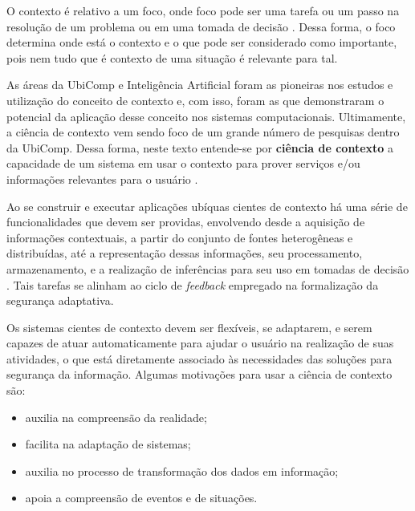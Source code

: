\documentclass[tid,table]{texufpel} %
\begin{document}
O contexto é relativo a um foco, onde foco pode ser uma tarefa ou um passo na resolução de um problema ou em uma tomada de decisão \cite{brezillon05}. Dessa forma, o foco determina onde está o contexto e o que pode ser considerado como importante, pois nem tudo que é contexto de uma situação é relevante para tal. 
 
As áreas da UbiComp e Inteligência Artificial foram as pioneiras nos estudos e utilização do conceito de contexto e, com isso, foram as que demonstraram o potencial da aplicação desse conceito nos sistemas computacionais. Ultimamente, a ciência de contexto vem sendo foco de um grande número de pesquisas dentro da UbiComp. Dessa forma, neste texto entende-se por \textbf{ciência de contexto} a capacidade de um sistema em usar o contexto para prover serviços e/ou informações relevantes para o usuário \cite{dey01}.

Ao se construir e executar aplicações ubíquas cientes de contexto há uma série de funcionalidades que devem ser providas, envolvendo desde a aquisição de informações contextuais, a partir do conjunto de fontes heterogêneas e distribuídas, até a representação dessas informações, seu processamento, armazenamento, e a realização de inferências para seu uso em tomadas de decisão \cite{bellavista12}. Tais tarefas se alinham ao ciclo de \textit{feedback} empregado na formalização da segurança adaptativa.

Os sistemas cientes de contexto devem ser flexíveis, se adaptarem, e serem capazes de atuar automaticamente para ajudar o usuário na realização de suas atividades, o que está diretamente associado às necessidades das soluções para segurança da informação. Algumas motivações para usar a ciência de contexto são: 

\begin{itemize}

\item auxilia na compreensão da realidade;

\item facilita na adaptação de sistemas;

\item auxilia no processo de transformação dos dados em informação;

\item apoia a compreensão de eventos e de situações.

\end{itemize}
\end{document}
